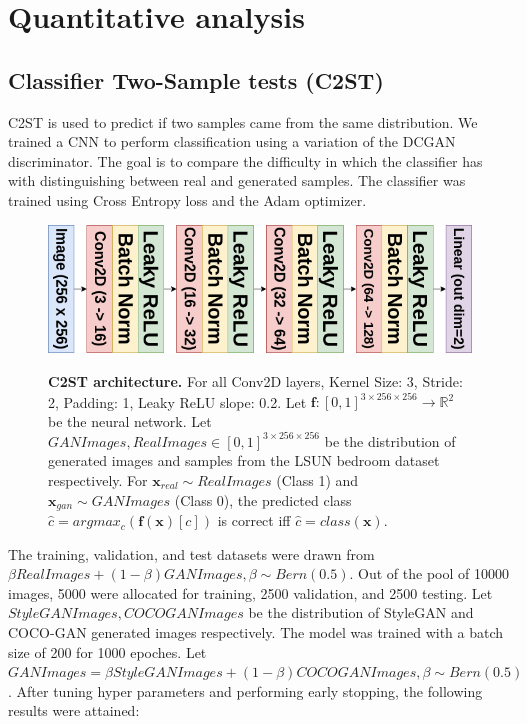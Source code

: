 \documentclass{article}
\begin{document}
        \section{Quantitative analysis}
        \label{sec:quantitative}
        \subsection{Classifier Two-Sample tests (C2ST)}
        \label{subsec:c2st}
        C2ST is used to predict if two samples came from the same distribution\cite{c2st}.
        We trained a CNN to perform classification using a variation of the DCGAN discriminator\cite{dcgan}.
        The goal is to compare the difficulty in which the classifier has with distinguishing between real and generated samples.
        The classifier was trained using Cross Entropy loss and the Adam optimizer.
        \begin{figure}[!htb]
          \centering
          \includegraphics[scale=0.3]{c2st-diagram.png}\\
          \caption{ \textbf{C2ST architecture.} For all Conv2D layers, Kernel Size: 3, Stride: 2, Padding: 1, Leaky ReLU slope: 0.2. Let $\mathbf{f}: [0, 1]^{3 \times 256 \times 256} \rightarrow \mathbb{R}^{2}$ be the neural network. Let $GANImages, RealImages \in [0, 1]^{3 \times 256 \times 256}$ be the distribution of generated images and samples from the LSUN bedroom dataset respectively. For $\mathbf{x}_{real} \sim RealImages$ (Class 1) and $\mathbf{x}_{gan} \sim GANImages$ (Class 0), the predicted class $\hat{c} =argmax_c (\mathbf{f}(\mathbf{x})[c])$ is correct iff $\hat{c} = class(\mathbf{x})$.}
        \end{figure}
        The training, validation, and test datasets were drawn from $\beta RealImages + (1 - \beta)GANImages, \beta \sim Bern(0.5)$.
        Out of the pool of 10000 images, 5000 were allocated for training, 2500 validation, and 2500 testing.
        Let $StyleGANImages, COCOGANImages$ be the distribution of StyleGAN and COCO-GAN generated images respectively. The model was trained with a batch size of 200 for 1000 epoches. Let $GANImages = \beta StyleGANImages + (1 - \beta) COCOGANImages, \beta \sim Bern(0.5)$.
        After tuning hyper parameters and performing early stopping, the following results were attained:
        
\end{document}
